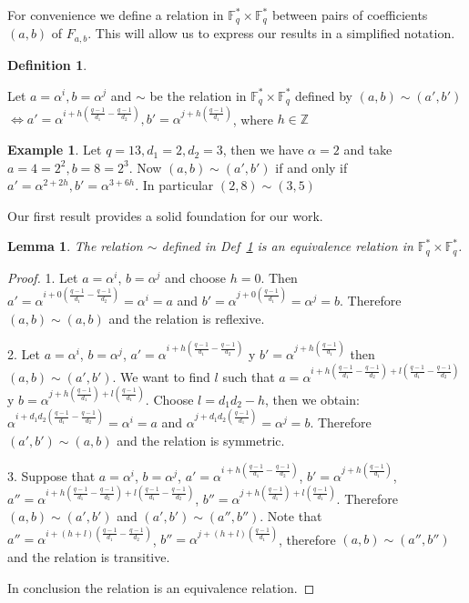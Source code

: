 \documentclass{article}
\newtheorem{lemma}[theorem]{Lemma}
\theoremstyle{definition}
\newtheorem{definition}[theorem]{Definition}
\newtheorem{example}[theorem]{Example}
\theoremstyle{remark}
\numberwithin{equation}{section}
\begin{document}
For convenience we define a relation in $\mathbb{F}_q^* \times \mathbb{F}_q^*$ between pairs of coefficients $(a,b)$ of $F_{a,b}$. This will allow us to express our results in a simplified notation.

\begin{definition}\label{relacion}

  Let $a = \alpha^i, b = \alpha^j$ and $\sim$ be the relation in $\mathbb{F}_q^* \times \mathbb{F}_q^*$ defined by $(a,b) \sim (a', b')$ 
  $\Longleftrightarrow a' = \alpha^{i+h(\frac{q-1}{d_1} - \frac{q-1}{d_2})}, b' = \alpha^{j+h(\frac{q-1}{d_1})}$, where $h \in \mathbb{Z}$

\end{definition}

 \begin{example}
    Let $q = 13, d_1 = 2, d_2 = 3$, then we have $\alpha = 2$ and take $a = 4 = 2^2, b = 8 = 2^3$. Now $(a,b) \sim (a',b')$ if and only if
    $a' = \alpha^{2+2h}, b' = \alpha^{3+6h}$. In particular $(2,8) \sim (3,5)$
  \end{example}

Our first result provides a solid foundation for our work.

\begin{lemma}
  
  The relation $\sim$ defined in Def~\ref{relacion} is an equivalence relation in $\mathbb{F}_q^* \times \mathbb{F}_q^*$.

\end{lemma}

\begin{proof}
  
  1. Let $a=\alpha^i$, $b=\alpha^j$ and choose $h=0$. Then $a' = \alpha^{i+0(\frac{q-1}{d_1}-\frac{q-1}{d_2})} = \alpha^i = a$ and $b' = \alpha^{j+0(\frac{q-1}{d_1})} = \alpha^j = b$. Therefore $(a,b) \sim (a,b)$ and the relation is reflexive.

  2. Let $a = \alpha^i$, $b=\alpha^j$, $a' = \alpha^{i+h(\frac{q-1}{d_1}-\frac{q-1}{d_2})}$ y $b' = \alpha^{j+h(\frac{q-1}{d_1})}$ then $(a,b) \sim (a',b')$. We want to find $l$ such that $a = \alpha^{i+h(\frac{q-1}{d_1}-\frac{q-1}{d_2})+l(\frac{q-1}{d_1}-\frac{q-1}{d_2})}$ y $b = \alpha^{j+h(\frac{q-1}{d_1})+l(\frac{q-1}{d_1})}$. Choose $l=d_1d_2-h$, then we obtain: $\alpha^{i+d_1d_2(\frac{q-1}{d_1}-\frac{q-1}{d_2})} = \alpha^i = a$ and $\alpha^{j+d_1d_2(\frac{q-1}{d_1})} = \alpha^j = b$. Therefore $(a',b') \sim (a,b) $ and the relation is symmetric.

  3. Suppose that $a = \alpha^i$, $b=\alpha^j$, $a' = \alpha^{i+h(\frac{q-1}{d_1}-\frac{q-1}{d_2})}$, $b' = \alpha^{j+h(\frac{q-1}{d_1})}$, $a'' = \alpha^{i+h(\frac{q-1}{d_1}-\frac{q-1}{d_2})+l(\frac{q-1}{d_1}-\frac{q-1}{d_2})}$, $b'' = \alpha^{j+h(\frac{q-1}{d_1})+l(\frac{q-1}{d_1})}$. Therefore $(a,b) \sim (a',b')$ and $(a',b') \sim (a'',b'')$. Note that $a'' = \alpha^{i+(h+l)(\frac{q-1}{d_1}-\frac{q-1}{d_2})}$, $b'' = \alpha^{j+(h+l)(\frac{q-1}{d_1})}$, therefore $(a,b) \sim (a'',b'')$ and the relation is transitive.

  In conclusion the relation is an equivalence relation.

\end{proof}
\end{document}
